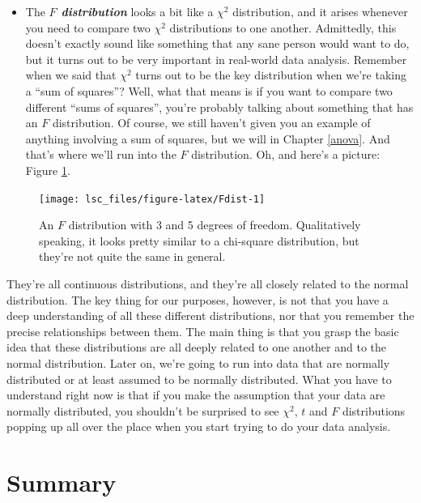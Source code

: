 \documentclass[
]{book}
\providecommand{\tightlist}{%
  \setlength{\itemsep}{0pt}\setlength{\parskip}{0pt}}
\theoremstyle{definition}
\theoremstyle{definition}
\theoremstyle{definition}
\theoremstyle{definition}
\theoremstyle{remark}
\begin{document}
\begin{itemize}
\tightlist
\item
  The \textbf{\emph{\(F\) distribution}} looks a bit like a \(\chi^2\) distribution, and it arises whenever you need to compare two \(\chi^2\) distributions to one another. Admittedly, this doesn't exactly sound like something that any sane person would want to do, but it turns out to be very important in real-world data analysis. Remember when we said that \(\chi^2\) turns out to be the key distribution when we're taking a ``sum of squares''? Well, what that means is if you want to compare two different ``sums of squares'', you're probably talking about something that has an \(F\) distribution. Of course, we still haven't given you an example of anything involving a sum of squares, but we will in Chapter \ref{anova}. And that's where we'll run into the \(F\) distribution. Oh, and here's a picture: Figure \ref{fig:Fdist}.
\end{itemize}

\begin{figure}

{\centering \texttt{[image: lsc\_files/figure-latex/Fdist-1]} 

}

\caption{An $F$ distribution with 3 and 5 degrees of freedom. Qualitatively speaking, it looks pretty similar to a chi-square distribution, but they're not quite the same in general.}\label{fig:Fdist}
\end{figure}

They're all continuous distributions, and they're all closely related to the normal distribution. The key thing for our purposes, however, is not that you have a deep understanding of all these different distributions, nor that you remember the precise relationships between them. The main thing is that you grasp the basic idea that these distributions are all deeply related to one another and to the normal distribution. Later on, we're going to run into data that are normally distributed or at least assumed to be normally distributed. What you have to understand right now is that if you make the assumption that your data are normally distributed, you shouldn't be surprised to see \(\chi^2\), \(t\) and \(F\) distributions popping up all over the place when you start trying to do your data analysis.

\hypertarget{summary-2}{%
\section{Summary}\label{summary-2}}
\end{document}
